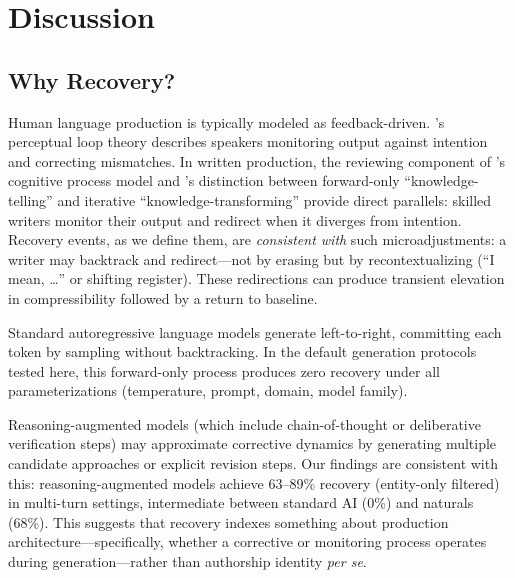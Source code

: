 \documentclass[11pt]{article}
\begin{document}

\section{Discussion}

\subsection{Why Recovery?}

Human language production is typically modeled as feedback-driven. \citeauthor{levelt1989speaking}'s \citeyearpar{levelt1989speaking} perceptual loop theory describes speakers monitoring output against intention and correcting mismatches. In written production, the reviewing component of \citeauthor{flower1981cognitive}'s \citeyearpar{flower1981cognitive} cognitive process model and \citeauthor{bereiter1987psychology}'s \citeyearpar{bereiter1987psychology} distinction between forward-only ``knowledge-telling'' and iterative ``knowledge-transforming'' provide direct parallels: skilled writers monitor their output and redirect when it diverges from intention. Recovery events, as we define them, are \textit{consistent with} such microadjustments: a writer may backtrack and redirect---not by erasing but by recontextualizing (``I mean, \ldots'' or shifting register). These redirections can produce transient elevation in compressibility followed by a return to baseline.

Standard autoregressive language models generate left-to-right, committing each token by sampling without backtracking. In the default generation protocols tested here, this forward-only process produces zero recovery under all parameterizations (temperature, prompt, domain, model family).

Reasoning-augmented models (which include chain-of-thought or deliberative verification steps) may approximate corrective dynamics by generating multiple candidate approaches or explicit revision steps. Our findings are consistent with this: reasoning-augmented models achieve 63--89\% recovery (entity-only filtered) in multi-turn settings, intermediate between standard AI (0\%) and naturals (68\%). This suggests that recovery indexes something about production architecture---specifically, whether a corrective or monitoring process operates during generation---rather than authorship identity \textit{per se}.
\end{document}
